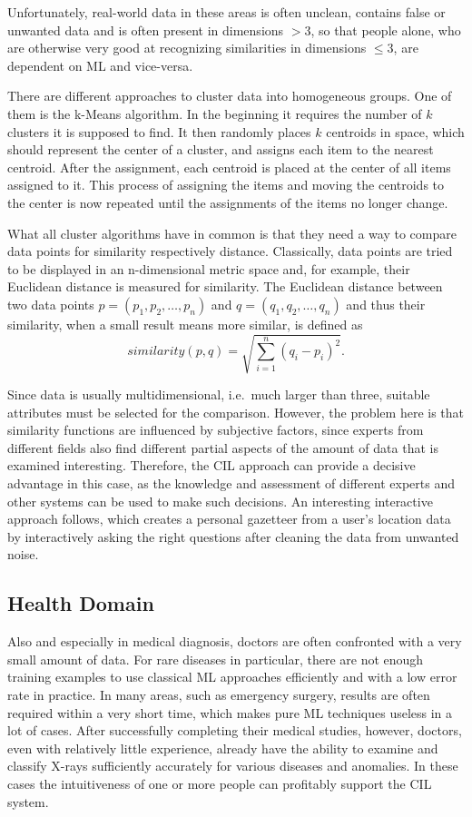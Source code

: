 \documentclass[conference]{IEEEtran}
\begin{document}
Unfortunately, real-world data in these areas is often unclean, contains false or unwanted data and is often present in 
dimensions $>$3, so that people alone, who are otherwise very good at recognizing similarities in dimensions $\le3$, are dependent on ML and vice-versa.

There are different approaches to cluster data into homogeneous groups. One of them is the k-Means algorithm\cite{FoundationsOfML:mohri}. In the beginning it requires the number of $k$ clusters it is supposed to find. 
It then randomly places $k$ centroids in space, which should represent the center of a cluster, and assigns each item to the nearest centroid. After the assignment, each centroid is placed at the center of all items assigned to it. This process of assigning the items and moving the centroids to
the center is now repeated until the assignments of the items no longer change.

What all cluster algorithms have in common is that they need a way to compare data points for similarity respectively distance.
Classically, data points are tried to be displayed in an n-dimensional metric space and, for example, their Euclidean distance is measured for similarity.
The Euclidean distance between two data points $p = (p_1, p_2, \dots, p_n)$ and $q = (q_1, q_2, \dots, q_n)$ and thus their
similarity, when a small result means more similar, is defined as
\begin{equation*}
    similarity(p, q) = \sqrt{\sum_{i=1}^{n} (q_i - p_i)^{2}}.
\end{equation*}

Since data is usually multidimensional, i.e.\ much larger than three, suitable attributes must be selected for the comparison. 
However, the problem here is that similarity functions are influenced by subjective factors, since experts from different 
fields also find different partial aspects of the amount of data that is examined interesting.
Therefore, the CIL approach can provide a decisive advantage in this case, as the knowledge and assessment of 
different experts and other systems can be used to make such decisions.
An interesting interactive approach follows\cite{DJ:frankowski}, which creates a personal gazetteer from a user's location data 
by interactively asking the right questions after cleaning the data from unwanted noise.

\subsection{Health Domain}
Also and especially in medical diagnosis, doctors are often confronted with a very small amount of data.
For rare diseases in particular, there are not enough training examples to use classical ML approaches efficiently and with a low error rate in practice.
In many areas, such as emergency surgery, results are often required within a very short time, which makes pure ML techniques useless in a lot of cases.
After successfully completing their medical studies, however, doctors, even with relatively little experience, already have the ability to examine and classify X-rays sufficiently accurately for various diseases and anomalies.
In these cases the intuitiveness of one or more people can profitably support the CIL system.
\end{document}
